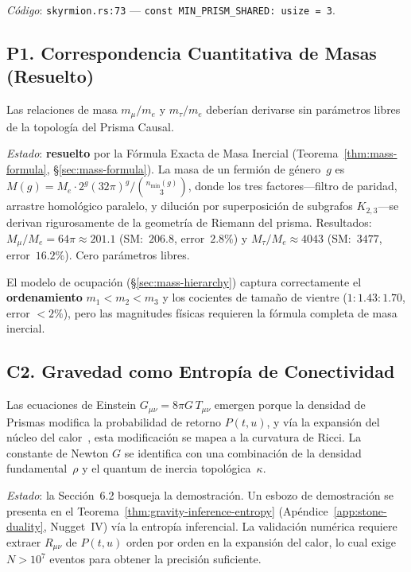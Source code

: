 \documentclass[11pt, a4paper, openany]{book}
\begin{document}
\medskip\noindent
\textit{C\'odigo}: \texttt{skyrmion.rs:73} ---
\texttt{const MIN\_PRISM\_SHARED: usize = 3}.

\subsection*{P1. Correspondencia Cuantitativa de Masas (Resuelto)}
\label{open:mass-ratios}

Las relaciones de masa $m_\mu/m_e$ y $m_\tau/m_e$ deber\'ian
derivarse sin par\'ametros libres de la topolog\'ia del
Prisma Causal.

\medskip\noindent
\textit{Estado}: \textbf{resuelto} por la F\'ormula Exacta de Masa
Inercial (Teorema~\ref{thm:mass-formula},
\S\ref{sec:mass-formula}). La masa de un fermi\'on de
g\'enero~$g$ es $M(g) = M_e \cdot 2^g (32\pi)^g / \binom{n_{\min}(g)}{3}$,
donde los tres factores---filtro de paridad, arrastre homol\'ogico
paralelo, y diluci\'on por superposici\'on de subgrafos
$K_{2,3}$---se derivan rigurosamente de la geometr\'ia de Riemann del
prisma. Resultados: $M_\mu/M_e = 64\pi \approx 201{.}1$
(SM:~$206{.}8$, error~$2{.}8\%$) y $M_\tau/M_e \approx 4043$
(SM:~$3477$, error~$16{.}2\%$). Cero par\'ametros libres.

El modelo de ocupaci\'on (\S\ref{sec:mass-hierarchy}) captura
correctamente el \textbf{ordenamiento} $m_1 < m_2 < m_3$ y los
cocientes de tama\~no de vientre ($1 : 1{.}43 : 1{.}70$, error
$< 2\%$), pero las magnitudes f\'isicas requieren la f\'ormula
completa de masa inercial.

\subsection*{C2. Gravedad como Entrop\'ia de Conectividad}
\label{conj:gravity-entropy}

Las ecuaciones de Einstein $G_{\mu\nu} = 8\pi G\,T_{\mu\nu}$
emergen porque la densidad de Prismas modifica la probabilidad de
retorno $P(t,u)$, y v\'ia la expansi\'on del n\'ucleo del
calor~\cite{minakshisundaram1949}, esta modificaci\'on se mapea a
la curvatura de Ricci. La constante de Newton $G$ se identifica
con una combinaci\'on de la densidad fundamental~$\rho$ y el
quantum de inercia topol\'ogica~$\kappa$.

\medskip\noindent
\textit{Estado}: la Secci\'on~6.2 bosqueja la demostraci\'on.
Un esbozo de demostraci\'on se presenta en el
Teorema~\ref{thm:gravity-inference-entropy}
(Ap\'endice~\ref{app:stone-duality}, Nugget~IV) v\'ia la
entrop\'ia inferencial. La
validaci\'on num\'erica requiere extraer $R_{\mu\nu}$ de $P(t,u)$
orden por orden en la expansi\'on del calor, lo cual exige
$N > 10^7$ eventos para obtener la precisi\'on suficiente.
\end{document}
